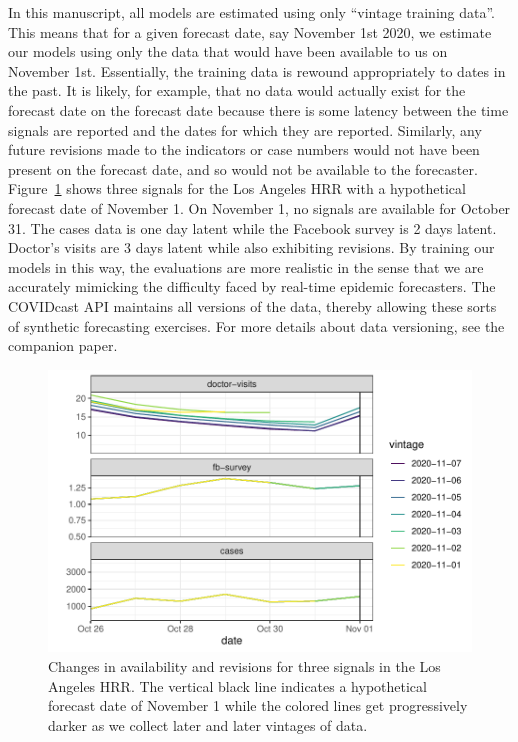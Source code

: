 \documentclass[9pt,twocolumn,twoside,lineno]{pnas-new}
\begin{document}
In this manuscript, all models are estimated using only ``vintage training
data''. This means that for a given forecast date, say November 1st 2020, we
estimate our models using only the data that would have been available to us on
November 1st. Essentially, the training data
is rewound appropriately to dates in the past. It is likely, for example, that
no data would actually exist 
for the forecast date on the forecast date because there is some latency between
the time signals are reported and the dates for which they are reported.
Similarly, any future revisions made to the indicators or case numbers would
not have been present on the forecast date, and so would not be available to the
forecaster. Figure~\ref{fig:vintage} shows three signals for the Los Angeles HRR
with a hypothetical forecast date of November 1. On November 1, no signals are
available for October 31. The cases data is one day latent while the Facebook
survey is 2 days latent. Doctor's visits are 3 days latent while also exhibiting
revisions.  
By training our models in this way, the evaluations are more realistic in the sense
that we are accurately mimicking the difficulty faced by real-time epidemic
forecasters. The COVIDcast API maintains all versions of the data, thereby allowing
these sorts of synthetic forecasting exercises. For more details about data
versioning, see the companion paper.

\begin{figure}
  \centering
  \includegraphics[width=\linewidth]{fig/vintage.pdf}
  \caption{Changes in availability and revisions for three signals in the Los
    Angeles HRR. The vertical black line indicates a hypothetical forecast date
    of November 1 while the colored lines get progressively darker as we collect
  later and later vintages of data.}
  \label{fig:vintage}
\end{figure}
\end{document}
